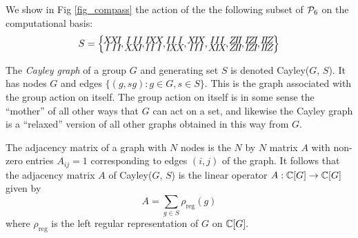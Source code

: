 \documentclass[12pt,notitlepage,longbibliography,nofootinbib,tightenlines]{revtex4}
\begin{document}
We show in Fig \ref{fig_compass} the action
of the 
the following subset of $\mathcal{P}_6$
on the computational basis:
$$
\arraycolsep=-1pt\def\arraystretch{0.2}
S = \Bigl\{
\begin{array}{ccc}
X&X&I\\
I&I&I
\end{array},
\begin{array}{ccc}
I&I&I\\
X&X&I
\end{array},
\begin{array}{ccc}
I&X&X\\
I&I&I
\end{array},
\begin{array}{ccc}
I&I&I\\
I&X&X
\end{array},
\begin{array}{ccc}
X&I&X\\
I&I&I
\end{array},
\begin{array}{ccc}
I&I&I\\
X&I&X
\end{array},
\begin{array}{ccc}
Z&I&I\\
Z&I&I
\end{array},
\begin{array}{ccc}
I&Z&I\\
I&Z&I
\end{array},
\begin{array}{ccc}
I&I&Z\\
I&I&Z
\end{array}
\Bigr\}
$$

The {\it Cayley graph} of a group $G$ and
generating set $S$ is denoted Cayley($G$, $S$).
It has nodes $G$ and edges $\{(g, sg) : g \in G, s \in S\}$.
This is the graph associated with the group action on itself.
The group action on itself is in some sense the ``mother'' of all other ways that
$G$ can act on a set, and likewise the Cayley graph is a ``relaxed'' version
of all other graphs obtained in this way from $G$.

The adjacency matrix of a graph with $N$ nodes is the 
$N$ by $N$ matrix $A$ with non-zero entries $A_{ij}=1$ corresponding
to edges $(i, j)$ of the graph.
It follows that the adjacency matrix $A$ of Cayley($G$, $S$)
is the linear operator $A:\mathbb{C}[G]\to\mathbb{C}[G]$
given by
$$
    A = \sum_{g\in S}\rho_{\mathrm{reg}}(g)
$$
where $\rho_{\mathrm{reg}}$ is the left regular representation of
$G$ on $\mathbb{C}[G].$
\end{document}
